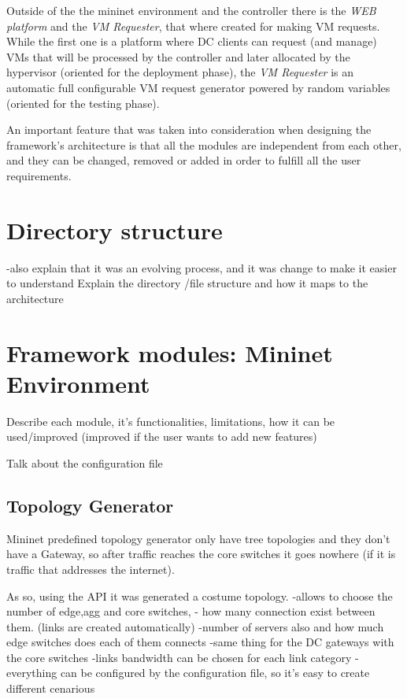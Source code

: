 \documentclass[12pt,english,oneside]{book}
\begin{document}
Outside of the the mininet environment and the controller there is the {\it WEB platform} and the {\it VM Requester}, that where created for making VM requests. While the first one is a platform where DC clients can request (and manage) VMs that will be processed by the controller and later allocated by the hypervisor (oriented for the deployment phase), the {\it VM Requester} is an automatic full configurable VM request generator powered by random variables (oriented for the testing phase).

An important feature that was taken into consideration when designing the framework's architecture is that all the modules are independent from each other, and they can be changed, removed or added in order to fulfill all the user requirements.

\section{Directory structure}

-also explain that it was an evolving process, and it was change to make it easier to understand
Explain the directory /file structure and how it maps to the architecture

\section{Framework modules: Mininet Environment}

Describe each module, it's functionalities, limitations, how it can be used/improved (improved if the user wants to add new features)

Talk about the configuration file

\subsection{Topology Generator}

Mininet predefined topology generator only have tree topologies and they don't have a Gateway, so after traffic reaches the core switches it goes nowhere (if it is traffic that addresses the internet).

As so, using the API it was generated a costume topology.
-allows to choose the number of edge,agg and core switches,
- how many connection exist between them. (links are created automatically)
-number of servers also and how much edge switches does each of them connects
-same thing for the DC gateways with the core switches
-links bandwidth can be chosen for each link category
-everything can be configured by the configuration file, so it's easy to create different cenarious
\end{document}
